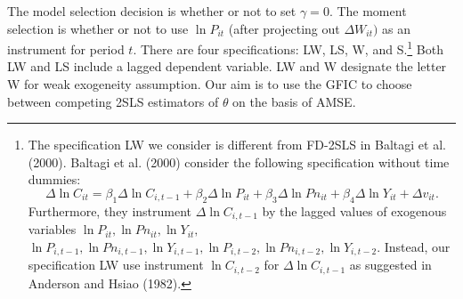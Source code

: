 The model selection decision is whether or not to set $\gamma = 0$. The moment selection is whether or not to use $\ln P_{it}$ (after projecting out $\Delta W_{it})$ as an instrument for period $t$.  There are four specifications:  LW, LS, W, and S.\footnote{The specification LW we consider is different from FD-2SLS in Baltagi et al. (2000). Baltagi et al. (2000) consider the following specification without time dummies:
 \[
\Delta \ln C_{it} = \beta_1 \Delta \ln C_{i,t-1} +  \beta_2 \Delta \ln P_{it} +\beta_3 \Delta \ln Pn_{it} +  \beta_4 \Delta \ln Y_{it} + \Delta v_{it}.
\]
Furthermore, they instrument $\Delta \ln C_{i,t-1}$ by the lagged values of exogenous variables $\ln P_{it}, \ln Pn_{it}, \ln Y_{it},$ $\ln P_{i,t-1}, \ln Pn_{i,t-1}, \ln Y_{i,t-1}, \ln P_{i,t-2}, \ln Pn_{i,t-2}, \ln Y_{i,t-2}$. Instead, our specification LW use instrument $\ln C_{i, t-2}$ for $\Delta \ln C_{i,t-1}$ as suggested in Anderson and Hsiao (1982).}
 Both LW and LS include a lagged dependent variable. LW and W designate the letter W for weak exogeneity assumption. Our aim is to use the GFIC to choose between competing 2SLS estimators of $\theta$ on the basis of AMSE. %
\newpage


